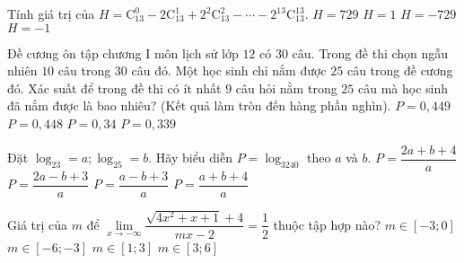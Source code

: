 \begin{ex}%
	Tính giá trị của $H=\mathrm{C}_{13}^0-2\mathrm{C}_{13}^1+2^2\mathrm{C}_{13}^2-\cdots-2^{13} \mathrm{C}_{13}^{13}$.
	\choice
	{$H=729$}
	{$H=1$}
	{$H=-729$}
	{\True $H=-1$}
\end{ex}
\begin{ex}%
	Đề cương ôn tập chương I môn lịch sử lớp $12$ có $30$ câu. Trong đề thi chọn ngẫu nhiên $10$ câu trong $30$ câu đó. Một học sinh chỉ nắm được $25$ câu trong đề cương đó. Xác suất để trong đề thi có ít nhất $9$ câu hỏi nằm trong $25$ câu mà học sinh đã nắm được là bao nhiêu? (Kết quả làm tròn đến hàng phần nghìn).
	\choice
	{$P=0,449$}
	{\True $P=0,448$}
	{$P=0,34$}
	{$P=0,339$}
\end{ex}
\begin{ex}%
	Đặt $\log_23=a;\log_25=b$. Hãy biểu diễn $P=\log_3240$ theo $a$ và $b$.
	\choice
	{$P=\dfrac{2a+b+4}{a}$}
	{$P=\dfrac{2a-b+3}{a}$}
	{$P=\dfrac{a-b+3}{a}$}
	{\True $P=\dfrac{a+b+4}{a}$}
\end{ex}
\begin{ex}%
	Giá trị của $m$ để $\lim \limits_{x\to -\infty}\dfrac{\sqrt{4x^2+x+1}+4}{mx-2}=\dfrac{1}{2}$ thuộc tập hợp nào?
	\choice
	{$m\in \left[-3;0\right]$}
	{\True  $m\in \left[-6;-3\right]$}
	{$m\in \left[1;3\right]$}
	{$m\in \left[3;6\right]$}
\end{ex}
